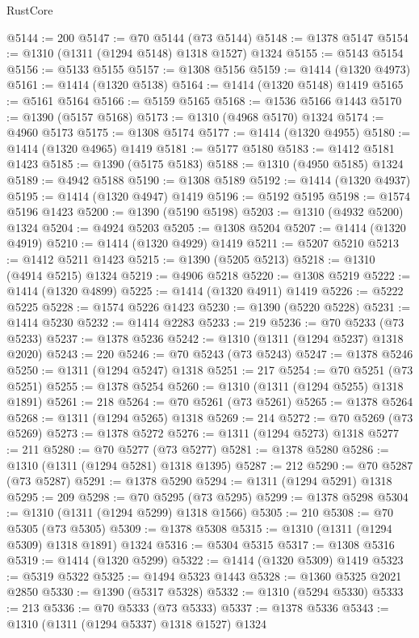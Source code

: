 \begin{lexlean}{RustCore}
\begin{coremodule}
@5144 := 200
@5147 := @70 @5144 (@73 @5144)
@5148 := @1378 @5147
@5154 := @1310 (@1311 (@1294 @5148) @1318 @1527) @1324
@5155 := @5143 @5154
@5156 := @5133 @5155
@5157 := @1308 @5156
@5159 := @1414 (@1320 @4973)
@5161 := @1414 (@1320 @5138)
@5164 := @1414 (@1320 @5148) @1419
@5165 := @5161 @5164
@5166 := @5159 @5165
@5168 := @1536 @5166 @1443
@5170 := @1390 (@5157 @5168)
@5173 := @1310 (@4968 @5170) @1324
@5174 := @4960 @5173
@5175 := @1308 @5174
@5177 := @1414 (@1320 @4955)
@5180 := @1414 (@1320 @4965) @1419
@5181 := @5177 @5180
@5183 := @1412 @5181 @1423
@5185 := @1390 (@5175 @5183)
@5188 := @1310 (@4950 @5185) @1324
@5189 := @4942 @5188
@5190 := @1308 @5189
@5192 := @1414 (@1320 @4937)
@5195 := @1414 (@1320 @4947) @1419
@5196 := @5192 @5195
@5198 := @1574 @5196 @1423
@5200 := @1390 (@5190 @5198)
@5203 := @1310 (@4932 @5200) @1324
@5204 := @4924 @5203
@5205 := @1308 @5204
@5207 := @1414 (@1320 @4919)
@5210 := @1414 (@1320 @4929) @1419
@5211 := @5207 @5210
@5213 := @1412 @5211 @1423
@5215 := @1390 (@5205 @5213)
@5218 := @1310 (@4914 @5215) @1324
@5219 := @4906 @5218
@5220 := @1308 @5219
@5222 := @1414 (@1320 @4899)
@5225 := @1414 (@1320 @4911) @1419
@5226 := @5222 @5225
@5228 := @1574 @5226 @1423
@5230 := @1390 (@5220 @5228)
@5231 := @1414 @5230
@5232 := @1414 @2283
@5233 := 219
@5236 := @70 @5233 (@73 @5233)
@5237 := @1378 @5236
@5242 := @1310 (@1311 (@1294 @5237) @1318 @2020)
@5243 := 220
@5246 := @70 @5243 (@73 @5243)
@5247 := @1378 @5246
@5250 := @1311 (@1294 @5247) @1318
@5251 := 217
@5254 := @70 @5251 (@73 @5251)
@5255 := @1378 @5254
@5260 := @1310 (@1311 (@1294 @5255) @1318 @1891)
@5261 := 218
@5264 := @70 @5261 (@73 @5261)
@5265 := @1378 @5264
@5268 := @1311 (@1294 @5265) @1318
@5269 := 214
@5272 := @70 @5269 (@73 @5269)
@5273 := @1378 @5272
@5276 := @1311 (@1294 @5273) @1318
@5277 := 211
@5280 := @70 @5277 (@73 @5277)
@5281 := @1378 @5280
@5286 := @1310 (@1311 (@1294 @5281) @1318 @1395)
@5287 := 212
@5290 := @70 @5287 (@73 @5287)
@5291 := @1378 @5290
@5294 := @1311 (@1294 @5291) @1318
@5295 := 209
@5298 := @70 @5295 (@73 @5295)
@5299 := @1378 @5298
@5304 := @1310 (@1311 (@1294 @5299) @1318 @1566)
@5305 := 210
@5308 := @70 @5305 (@73 @5305)
@5309 := @1378 @5308
@5315 := @1310 (@1311 (@1294 @5309) @1318 @1891) @1324
@5316 := @5304 @5315
@5317 := @1308 @5316
@5319 := @1414 (@1320 @5299)
@5322 := @1414 (@1320 @5309) @1419
@5323 := @5319 @5322
@5325 := @1494 @5323 @1443
@5328 := @1360 @5325 @2021 @2850
@5330 := @1390 (@5317 @5328)
@5332 := @1310 (@5294 @5330)
@5333 := 213
@5336 := @70 @5333 (@73 @5333)
@5337 := @1378 @5336
@5343 := @1310 (@1311 (@1294 @5337) @1318 @1527) @1324

\end{coremodule}
\end{lexlean}

